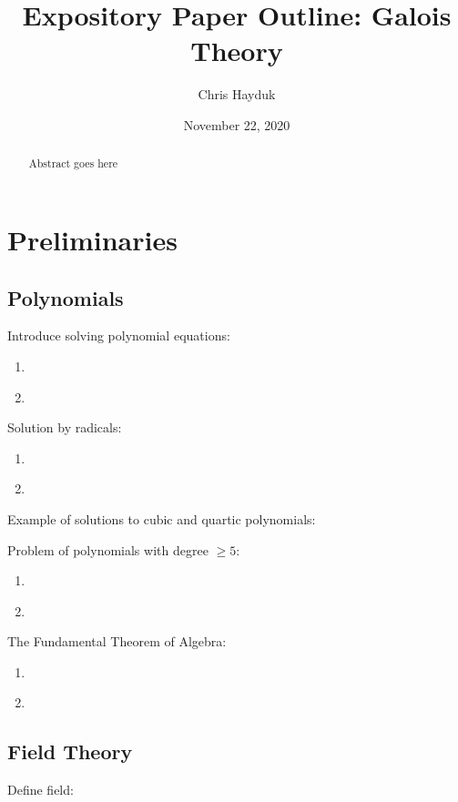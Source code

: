 \documentclass[11pt, a4paper, oneside]{article}
\theoremstyle{plain}
\theoremstyle{definition}
\theoremstyle{example}
\begin{document}
\title{Expository Paper Outline: Galois Theory}
\author{Chris Hayduk}
\date{November 22, 2020}
\maketitle

\begin{abstract}
Abstract goes here
\end{abstract}

\newpage
\section{Preliminaries}

\subsection{Polynomials}

Introduce solving polynomial equations:
\begin{enumerate}
\item \cite[Sec. 1.3]{stewart}
\item \cite[Ch. 1]{jorg}
\end{enumerate}

Solution by radicals:
\begin{enumerate}
\item \cite[Sec. 1.4]{stewart}
\item \cite[Ch. 1, 2]{jorg}
\end{enumerate}

Example of solutions to cubic and quartic polynomials: \cite[Ch. 1]{juliusz}

Problem of polynomials with degree $\geq 5$:
\begin{enumerate}
\item \cite[Ch. 1]{jorg}
\item \cite{galoiswiki}
\end{enumerate}

The Fundamental Theorem of Algebra: 
\begin{enumerate}
\item \cite[Section 2.2]{stewart}
\item \cite[Ch. 4]{jorg} 
\end{enumerate}

\subsection{Field Theory}

Define field: \cite[Sec. 7.1]{dummit}
\end{document}
